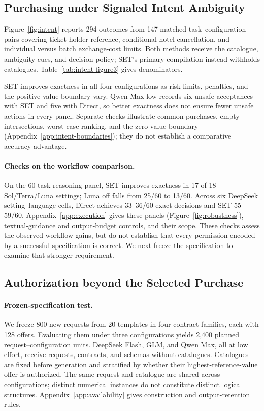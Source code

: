 \documentclass[11pt]{article}
\begin{document}
\subsection{Purchasing under Signaled Intent Ambiguity}
\label{sec:intent-decisions}
Figure~\ref{fig:intent} reports 294 outcomes from 147 matched task--configuration pairs covering ticket-holder reference, conditional hotel cancellation, and individual versus batch exchange-cost limits. Both methods receive the catalogue, ambiguity cues, and decision policy; SET's primary compilation instead withholds catalogues. Table~\ref{tab:intent-figure3} gives denominators.

SET improves exactness in all four configurations as risk limits, penalties, and the positive-value boundary vary. Qwen Max low records six unsafe acceptances with SET and five with Direct, so better exactness does not ensure fewer unsafe actions in every panel. Separate checks illustrate common purchases, empty intersections, worst-case ranking, and the zero-value boundary (Appendix~\ref{app:intent-boundaries}); they do not establish a comparative accuracy advantage.

\paragraph{Checks on the workflow comparison.}
\label{sec:robustness}
On the 60-task reasoning panel, SET improves exactness in 17 of 18 Sol/Terra/Luna settings; Luna off falls from 25/60 to 13/60. Across six DeepSeek setting--language cells, Direct achieves 33--36/60 exact decisions and SET 55--59/60. Appendix~\ref{app:execution} gives these panels (Figure~\ref{fig:robustness}), textual-guidance and output-budget controls, and their scope. These checks assess the observed workflow gains, but do not establish that every permission encoded by a successful specification is correct. We next freeze the specification to examine that stronger requirement.

\subsection{Authorization beyond the Selected Purchase}
\label{sec:permissions}
\label{sec:components}
\paragraph{Frozen-specification test.}
We freeze 800 new requests from 20 templates in four contract families, each with 128 offers. Evaluating them under three configurations yields 2,400 planned request--configuration units. DeepSeek Flash, GLM, and Qwen Max, all at low effort, receive requests, contracts, and schemas without catalogues. Catalogues are fixed before generation and stratified by whether their highest-reference-value offer is authorized. The same request and catalogue are shared across configurations; distinct numerical instances do not constitute distinct logical structures. Appendix~\ref{app:availability} gives construction and output-retention rules.
\end{document}
